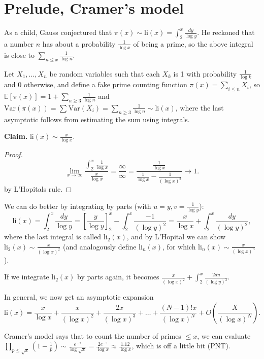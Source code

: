 \documentclass{article}
\theoremstyle{definition}
\theoremstyle{remark}
\begin{document}
\section{Prelude, Cramer's model}

As a child, Gauss conjectured that $\pi(x) \sim \text{li}(x) = \int_{2}^{x} \frac{dy}{\log y}$. He reckoned that a number $n$ has about a probability $\frac{1}{\log x}$ of being a prime, so the above integral is close to $\sum_{n\le x}^{} \frac{1}{\log n}$.

\vspace{1mm}

Let $X_1, \ldots, X_n$ be random variables such that each $X_k$ is 1 with probability $\frac{1}{\log k}$ and 0 otherwise, and define a fake prime counting function $\pi(x) = \sum_{i\le n}^{} X_i$, so $\mathbb{E}[\pi(x)] = 1 + \sum_{n \ge 3}^{} \frac{1}{\log n}$ and $\text{Var}(\pi(x)) = \sum_{}^{} \text{Var}(X_i) = \sum_{n \ge 3}^{} \frac{1}{\log n} \sim \text{li}(x)$, where the last asymptotic follows from estimating the sum using integrals.

\vspace{1mm}

\textbf{Claim.} $\text{li}(x) \sim \frac{x}{\log x}$. 

\begin{proof}
    \[
    \lim_{x \to \infty}\frac{\int_{2}^{x} \frac{1}{\log x}}{\frac{x}{\log x}} = \frac{\infty}{\infty} = \frac{\frac{1}{\log x}}{\frac{1}{\log x} - \frac{1}{(\log x)^2}} \to 1.
    \] by L'Hopitals rule.
\end{proof}

We can do better by integrating by parts (with $u=y, v= \frac{1}{\log y}$):
\[
\text{li}(x) = \int_{2}^{x} \frac{dy}{\log y} = \left[\frac{y}{\log y}\right]^x_2 - \int_{2}^{x} \frac{-1}{(\log y)^2} = \frac{x}{\log x} + \int_{2}^{x} \frac{dy}{(\log y)^2},
\]
where the last integral is called $\text{li}_2(x)$, and by L'Hopital we can show $\text{li}_2(x) \sim \frac{x}{(\log x)^2}$ (and analogously define $\text{li}_n(x)$, for which $\text{li}_n(x) \sim \frac{x}{(\log x)^n}$).

If we integrate $\text{li}_2(x)$ by parts again, it becomes $\frac{x}{(\log x)^2} + \int_{2}^{x} \frac{2dy}{(\log y)^3}$.

In general, we now get an asymptotic expansion
\[
\text{li}(x) = \frac{x}{\log x} + \frac{x}{(\log x)^2} + \frac{2x}{(\log x)^3} + \ldots + \frac{(N-1)!x}{(\log x)^N} + O\left(\frac{X}{(\log x)^N} \right).
\]

Cramer's model says that to count the number of primes $\le x$, we can evaluate $\prod_{p \le \sqrt{x}}^{} (1 - \frac{1}{p}) \sim \frac{e^{-\gamma}}{\log \sqrt{x}} = \frac{2e^{-\gamma}}{\log x} \approx \frac{1.12}{\log x}$, which is off a little bit (PNT).
\end{document}
